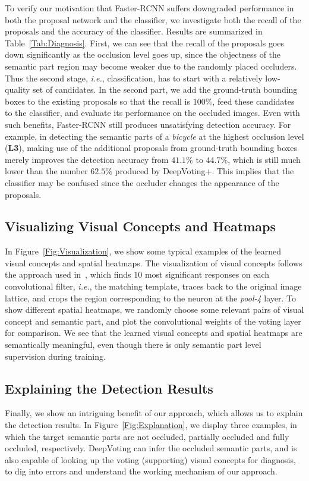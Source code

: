 \documentclass[10pt,twocolumn,letterpaper]{article}
\begin{document}
  To verify our motivation that Faster-RCNN suffers downgraded performance in both the proposal network and the classifier, we investigate both the recall of the proposals and the accuracy of the classifier. Results are summarized in Table~\ref{Tab:Diagnosis}. First, we can see that the recall of the proposals goes down significantly as the occlusion level goes up, since the objectness of the semantic part region may become weaker due to the randomly placed occluders. Thus the second stage, {\em i.e.}, classification, has to start with a relatively low-quality set of candidates. In the second part, we add the ground-truth bounding boxes to the existing proposals so that the recall is $100\%$, feed these candidates to the classifier, and evaluate its performance on the occluded images. Even with such benefits, Faster-RCNN still produces unsatisfying detection accuracy. For example, in detecting the semantic parts of a {\em bicycle} at the highest occlusion level ({\bf L3}), making use of the additional proposals from ground-truth bounding boxes merely improves the detection accuracy from $41.1\%$ to $44.7\%$, which is still much lower than the number $62.5\%$ produced by DeepVoting+. This implies that the classifier may be confused since the occluder changes the appearance of the proposals.


  \subsection{Visualizing Visual Concepts and Heatmaps}
  \label{Experiments:NonOcclusion:Visualization}

  In Figure~\ref{Fig:Visualization}, we show some typical examples of the learned visual concepts and spatial heatmaps. The visualization of visual concepts follows the approach used in~\cite{Wang_2017_VC_journal}, which finds $10$ most significant responses on each convolutional filter, {\em i.e.}, the matching template, traces back to the original image lattice, and crops the region corresponding to the neuron at the {\em pool-4} layer. To show different spatial heatmaps, we randomly choose some relevant pairs of visual concept and semantic part, and plot the convolutional weights of the voting layer for comparison. We see that the learned visual concepts and spatial heatmaps are semantically meaningful, even though there is only semantic part level supervision during training.


  \subsection{Explaining the Detection Results}
  \label{Experiments:Explanation}
  Finally, we show an intriguing benefit of our approach, which allows us to explain the detection results. In Figure~\ref{Fig:Explanation}, we display three examples, in which the target semantic parts are not occluded, partially occluded and fully occluded, respectively. DeepVoting can infer the occluded semantic parts, and is also capable of looking up the voting (supporting) visual concepts for diagnosis, to dig into errors and understand the working mechanism of our approach.
\end{document}
